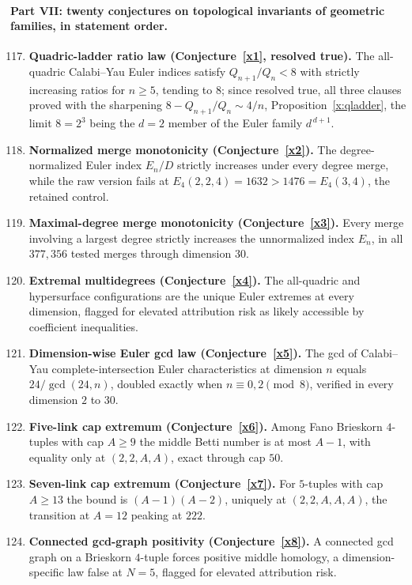 \documentclass[11pt]{article}
\theoremstyle{definition}
\begin{document}
\paragraph{Part VII: twenty conjectures on topological invariants of geometric families, in statement order.}
\begin{enumerate}\setcounter{enumi}{116}
\item \textbf{Quadric-ladder ratio law (Conjecture~\ref{x1}, resolved true).}  The all-quadric Calabi--Yau Euler indices satisfy $Q_{n+1}/Q_n<8$ with strictly increasing ratios for $n\ge5$, tending to $8$; since resolved true, all three clauses proved with the sharpening $8-Q_{n+1}/Q_n\sim4/n$, Proposition~\ref{x:qladder}, the limit $8=2^3$ being the $d=2$ member of the Euler family $d^{\,d+1}$.
\item \textbf{Normalized merge monotonicity (Conjecture~\ref{x2}).}  The degree-normalized Euler index $E_n/D$ strictly increases under every degree merge, while the raw version fails at $E_4(2,2,4)=1632>1476=E_4(3,4)$, the retained control.
\item \textbf{Maximal-degree merge monotonicity (Conjecture~\ref{x3}).}  Every merge involving a largest degree strictly increases the unnormalized index $E_n$, in all $377{,}356$ tested merges through dimension $30$.
\item \textbf{Extremal multidegrees (Conjecture~\ref{x4}).}  The all-quadric and hypersurface configurations are the unique Euler extremes at every dimension, flagged for elevated attribution risk as likely accessible by coefficient inequalities.
\item \textbf{Dimension-wise Euler gcd law (Conjecture~\ref{x5}).}  The gcd of Calabi--Yau complete-intersection Euler characteristics at dimension $n$ equals $24/\gcd(24,n)$, doubled exactly when $n\equiv0,2\pmod8$, verified in every dimension $2$ to $30$.
\item \textbf{Five-link cap extremum (Conjecture~\ref{x6}).}  Among Fano Brieskorn $4$-tuples with cap $A\ge9$ the middle Betti number is at most $A-1$, with equality only at $(2,2,A,A)$, exact through cap $50$.
\item \textbf{Seven-link cap extremum (Conjecture~\ref{x7}).}  For $5$-tuples with cap $A\ge13$ the bound is $(A-1)(A-2)$, uniquely at $(2,2,A,A,A)$, the transition at $A=12$ peaking at $222$.
\item \textbf{Connected gcd-graph positivity (Conjecture~\ref{x8}).}  A connected gcd graph on a Brieskorn $4$-tuple forces positive middle homology, a dimension-specific law false at $N=5$, flagged for elevated attribution risk.

\end{enumerate}
\end{document}
